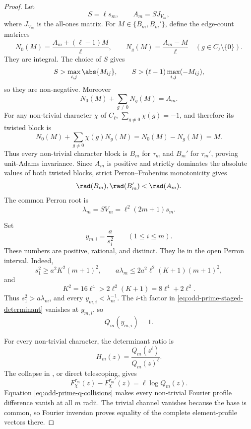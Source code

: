 \begin{proof}
Let
\begin{equation}\label{eq:odd-prime-common-base}
 S=\ell s_m,
 \qquad
 A_m=S J_{V_m},
\end{equation}
where \(J_{V_m}\) is the all-ones matrix.  For
\(M\in\{B_m,B_m'\}\), define the edge-count matrices
\begin{equation}\label{eq:odd-prime-label-counts}
 N_0(M)=\frac{A_m+(\ell-1)M}{\ell},
 \qquad
 N_g(M)=\frac{A_m-M}{\ell}\quad(g\in C_\ell\setminus\{0\}).
\end{equation}
They are integral.  The choice of \(S\) gives
\[
 S>\max_{i,j}\abs{M_{ij}},
 \qquad
 S>(\ell-1)\max_{i,j}(-M_{ij}),
\]
so they are non-negative.  Moreover
\[
 N_0(M)+\sum_{g\ne0}N_g(M)=A_m.
\]
For any non-trivial character \(\chi\) of \(C_\ell\),
\(\sum_{g\ne0}\chi(g)=-1\), and therefore its twisted block is
\[
 N_0(M)+\sum_{g\ne0}\chi(g)N_g(M)=N_0(M)-N_g(M)=M.
\]
Thus every non-trivial character block is \(B_m\) for \(\tau_m\) and
\(B_m'\) for \(\tau_m'\), proving unit-Adams invariance.  Since \(A_m\) is
positive and strictly dominates the absolute values of both twisted blocks,
strict Perron--Frobenius monotonicity gives
\[
 \rad(B_m),\rad(B_m')<\rad(A_m).
\]
The common Perron root is
\begin{equation}\label{eq:odd-prime-perron-root}
 \lambda_m=SV_m=\ell^2(2m+1)s_m.
\end{equation}

Set
\begin{equation}\label{eq:odd-prime-collision-radii}
 y_{m,i}=\frac{a}{s_i^2}\qquad(1\le i\le m).
\end{equation}
These numbers are positive, rational, and distinct.  They lie in the open
Perron interval.  Indeed,
\[
 s_1^2\ge a^2K^2(m+1)^2,
 \qquad
 a\lambda_m\le2a^2\ell^2(K+1)(m+1)^2,
\]
and
\[
 K^2=16\ell^4>2\ell^2(K+1)=8\ell^4+2\ell^2.
\]
Thus \(s_1^2>a\lambda_m\), and every
\(y_{m,i}<\lambda_m^{-1}\).  The \(i\)-th factor in
\eqref{eq:odd-prime-staged-determinant} vanishes at \(y_{m,i}\), so
\begin{equation}\label{eq:odd-prime-q-collisions}
 Q_m(y_{m,i})=1.
\end{equation}

For every non-trivial character, the determinant ratio is
\begin{equation}\label{eq:odd-prime-mahler-ratio}
 H_m(z)=\frac{Q_m(z^\ell)}{Q_m(z)^\ell}.
\end{equation}
The collapse in , or direct
telescoping, gives
\[
 F_\chi^{\tau_m}(z)-F_\chi^{\tau_m'}(z)
 =\ell\log Q_m(z).
\]
Equation \eqref{eq:odd-prime-q-collisions} makes every non-trivial Fourier
profile difference vanish at all \(m\) radii.  The trivial channel vanishes
because the base is common, so Fourier inversion proves equality of the
complete element-profile vectors there.


\end{proof}
